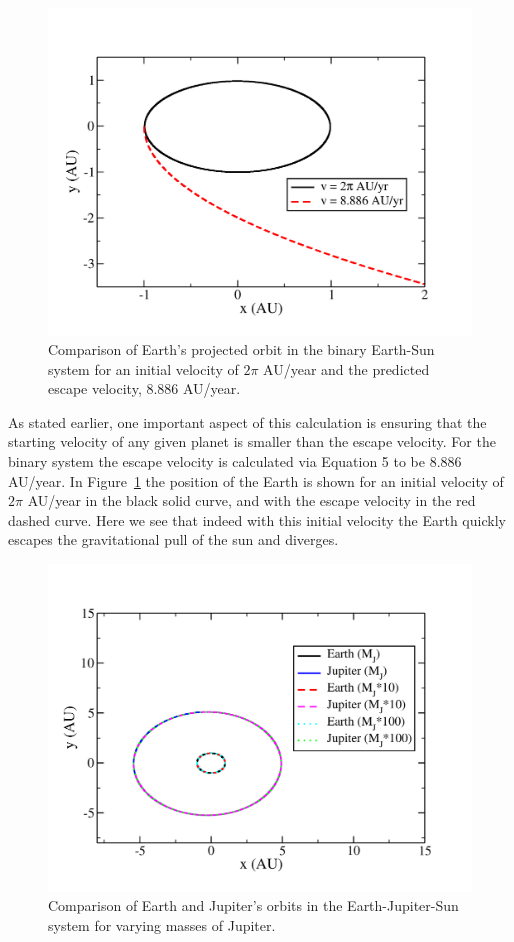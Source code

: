 \documentclass[prc,amsmath,twocolumn,superscriptaddress]{revtex4}
\begin{document}
\begin{figure}[b]
\includegraphics[scale=0.33]{escape.pdf}
\caption{Comparison of Earth's projected orbit in the binary Earth-Sun system for an initial velocity of $2\pi$ AU/year and the predicted escape velocity, 8.886 AU/year.}
\label{escape}
\end{figure}

As stated earlier, one important aspect of this calculation is ensuring that the starting velocity of any given planet is smaller than the escape velocity. For the binary system the escape velocity is calculated via Equation 5 to be 8.886 AU/year. In Figure~\ref{escape} the position of the Earth is shown for an initial velocity of $2\pi$ AU/year in the black solid curve, and with the escape velocity in the red dashed curve. Here we see that indeed with this initial velocity the Earth quickly escapes the gravitational pull of the sun and diverges.


\begin{figure}[t]
\includegraphics[scale=0.33]{three_mj.pdf}
\caption{Comparison of Earth and Jupiter's orbits in the Earth-Jupiter-Sun system for varying masses of Jupiter.}
\label{mj}
\end{figure}
\end{document}
